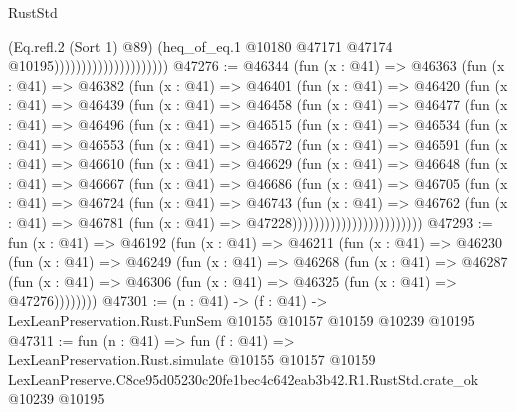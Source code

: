 \begin{lexlean}{RustStd}
\begin{coremodule}
                                            (Eq.refl.{2} (Sort 1) @89)
                                            (heq_of_eq.{1}
                                              @10180
                                              @47171
                                              @47174
                                              @10195)))))))))))))))))))))
@47276 := @46344
    (fun (x : @41) =>
    @46363
      (fun (x : @41) =>
      @46382
        (fun (x : @41) =>
        @46401
          (fun (x : @41) =>
          @46420
            (fun (x : @41) =>
            @46439
              (fun (x : @41) =>
              @46458
                (fun (x : @41) =>
                @46477
                  (fun (x : @41) =>
                  @46496
                    (fun (x : @41) =>
                    @46515
                      (fun (x : @41) =>
                      @46534
                        (fun (x : @41) =>
                        @46553
                          (fun (x : @41) =>
                          @46572
                            (fun (x : @41) =>
                            @46591
                              (fun (x : @41) =>
                              @46610
                                (fun (x : @41) =>
                                @46629
                                  (fun (x : @41) =>
                                  @46648
                                    (fun (x : @41) =>
                                    @46667
                                      (fun (x : @41) =>
                                      @46686
                                        (fun (x : @41) =>
                                        @46705
                                          (fun (x : @41) =>
                                          @46724
                                            (fun (x : @41) =>
                                            @46743
                                              (fun (x : @41) =>
                                              @46762
                                                (fun (x : @41) =>
                                                @46781
                                                  (fun (x : @41) => @47228))))))))))))))))))))))))
@47293 := fun (x : @41) =>
  @46192
    (fun (x : @41) =>
    @46211
      (fun (x : @41) =>
      @46230
        (fun (x : @41) =>
        @46249
          (fun (x : @41) =>
          @46268
            (fun (x : @41) =>
            @46287
              (fun (x : @41) => @46306 (fun (x : @41) => @46325 (fun (x : @41) => @47276))))))))
@47301 := (n : @41) ->
  (f : @41) -> LexLeanPreservation.Rust.FunSem @10155 @10157 @10159 @10239 @10195
@47311 := fun (n : @41) =>
  fun (f : @41) =>
  LexLeanPreservation.Rust.simulate
    @10155
    @10157
    @10159
    LexLeanPreserve.C8ce95d05230c20fe1bec4c642eab3b42.R1.RustStd.crate_ok
    @10239
    @10195
\end{coremodule}
\end{lexlean}
